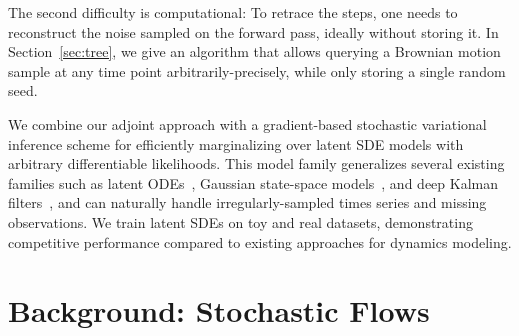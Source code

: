 \documentclass[twoside]{article}
\begin{document}
The second difficulty is computational:
To retrace the steps, one needs to reconstruct the noise sampled on the forward pass, ideally without storing it.
In Section~\ref{sec:tree}, we give an algorithm that allows querying a Brownian motion sample at any time point arbitrarily-precisely, while only storing a single random seed.


We combine our adjoint approach with a gradient-based stochastic variational inference scheme for efficiently marginalizing over latent SDE models with arbitrary differentiable likelihoods.
This model family generalizes several existing families such as latent ODEs~\cite{chen2018neural,rubanova2019latent},
Gaussian state-space models~\cite{kitagawa1996linear, turner2010state},
and deep Kalman filters~\cite{krishnan2017structured}, and can naturally handle irregularly-sampled times series and missing observations.
We train latent SDEs on toy and real datasets, demonstrating competitive performance compared to existing approaches for dynamics modeling. 
 \section{Background: Stochastic Flows}
\end{document}
